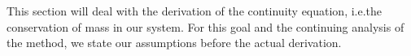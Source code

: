 This section will deal with the derivation of the continuity equation, i.e.\@ the conservation of mass in our system.
For this goal and the continuing analysis of the method, we state our assumptions before the actual derivation.
